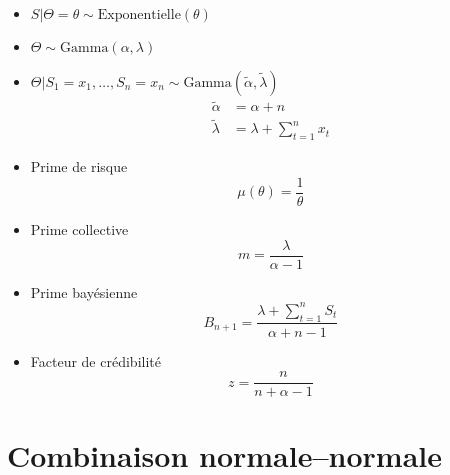 \begin{itemize}
\item $S|\Theta = \theta \sim \text{Exponentielle}(\theta)$
\item $\Theta \sim \text{Gamma}(\alpha, \lambda)$
\item $\Theta|S_1 = x_1, \dots, S_n = x_n \sim
  \text{Gamma}(\tilde{\alpha}, \tilde{\lambda})$
  \begin{align*}
    \tilde{\alpha} &= \alpha + n \\
    \tilde{\lambda} &= \lambda + \sum_{t = 1}^n x_t
  \end{align*}
\item Prime de risque
  \begin{equation*}
    \mu(\theta) = \frac{1}{\theta}
  \end{equation*}
\item Prime collective
  \begin{equation*}
    m = \frac{\lambda}{\alpha - 1}
  \end{equation*}
\item Prime bayésienne
  \begin{equation*}
    B_{n + 1} = \frac{\lambda + \sum_{t = 1}^n S_t}{\alpha + n - 1}
  \end{equation*}
\item Facteur de crédibilité
  \begin{equation*}
    z = \frac{n}{n + \alpha - 1}
  \end{equation*}
\end{itemize}


\section{Combinaison normale--normale}

